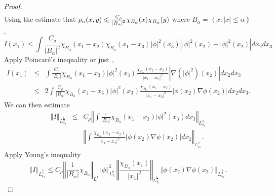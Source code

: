 \documentclass[12pt,letterpaper,leqno]{amsart}
\theoremstyle{plain}
\numberwithin{equation}{section}
\numberwithin{theorem}{section}
\numberwithin{proposition}{section}
\numberwithin{lemma}{section}
\numberwithin{corollary}{section}
\begin{document}
\begin{proof}
\begin{eqnarray*}
\end{eqnarray*}%
Using the estimate that $\rho _{\alpha }(x,y)\leqslant \frac{C_{\rho }}{%
\left\vert B_{\alpha }\right\vert ^{2}}\chi _{B_{\alpha }}(x)\chi
_{B_{\alpha }}(y)$ where $B_{\alpha }=\left\{ x:\left\vert x\right\vert
\leqslant \alpha \right\} $, 
\begin{equation*}
I(x_{1})\leqslant \int \frac{C_{\rho }}{\left\vert B_{\alpha }\right\vert
^{2}}\chi _{B_{\alpha }}(x_{1}-x_{2})\chi _{B_{\alpha
}}(x_{1}-x_{3})\left\vert \phi \right\vert ^{2}(x_{3})\left\vert \left\vert
\phi \right\vert ^{2}(x_{2})-\left\vert \phi \right\vert
^{2}(x_{2})\right\vert dx_{2}dx_{3}
\end{equation*}%
Apply Poincar\'{e}'s inequality or just \cite[$\left( A.14\right) $]{E-S-Y2},%
\begin{eqnarray*}
I(x_{1}) &\leqslant &\int \frac{C_{\rho }}{\left\vert B_{\alpha }\right\vert 
}\chi _{B_{\alpha }}(x_{1}-x_{3})\left\vert \phi \right\vert ^{2}(x_{3})%
\frac{\chi _{B_{\alpha }}(x_{1}-x_{2})}{\left\vert x_{1}-x_{2}\right\vert
^{2}}\left\vert \nabla \left( \left\vert \phi \right\vert ^{2}\right)
(x_{2})\right\vert dx_{2}dx_{3} \\
&\leqslant &2\int \frac{C_{\rho }}{\left\vert B_{\alpha }\right\vert }\chi
_{B_{\alpha }}(x_{1}-x_{3})\left\vert \phi \right\vert ^{2}(x_{3})\frac{\chi
_{B_{\alpha }}(x_{1}-x_{2})}{\left\vert x_{1}-x_{2}\right\vert ^{2}}%
\left\vert \phi (x_{2})\nabla \phi (x_{2})\right\vert dx_{2}dx_{3}.
\end{eqnarray*}%
We can then estimate 
\begin{eqnarray*}
\left\Vert I\right\Vert _{L_{x_{1}}^{\frac{6}{5}}} &\leqslant &C_{\rho
}\left\Vert \int \frac{1}{\left\vert B_{\alpha }\right\vert }\chi
_{B_{\alpha }}(x_{1}-x_{3})\left\vert \phi \right\vert
^{2}(x_{3})dx_{3}\right\Vert _{L_{x_{1}}^{3}} \\
&&\left\Vert \int \frac{\chi _{B_{\alpha }}(x_{1}-x_{2})}{\left\vert
x_{1}-x_{2}\right\vert ^{2}}\left\vert \phi (x_{2})\nabla \phi
(x_{2})\right\vert dx_{2}\right\Vert _{L_{x_{1}}^{2}}.
\end{eqnarray*}%
Apply Young's inequality%
\begin{equation*}
\left\Vert I\right\Vert _{L_{x_{1}}^{\frac{6}{5}}}\leqslant C_{\rho
}\left\Vert \frac{1}{\left\vert B_{\alpha }\right\vert }\chi _{B_{\alpha
}}\right\Vert _{L^{1}}\left\Vert \phi \right\Vert
_{L_{x_{1}}^{6}}^{2}\left\Vert \frac{\chi _{B_{\alpha }}(x_{1})}{\left\vert
x_{1}\right\vert ^{2}}\right\Vert _{L_{x_{1}}^{\frac{6}{5}}}\left\Vert \phi
(x_{2})\nabla \phi (x_{2})\right\Vert _{L_{x_{2}}^{\frac{3}{2}}}.

\end{equation*}
\end{proof}
\end{document}
